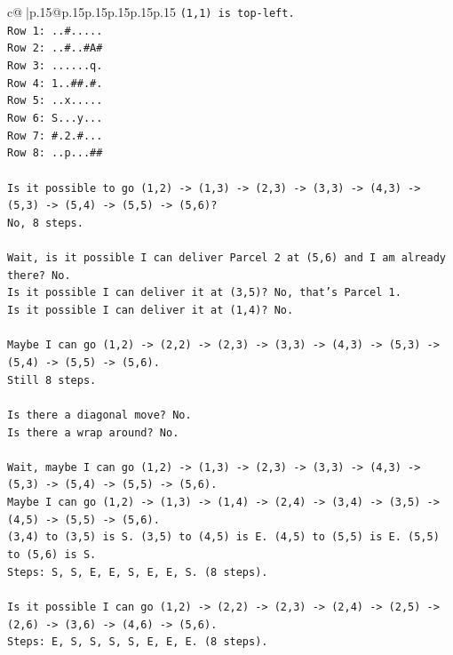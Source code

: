 \documentclass{article}
\begin{document}
{\begin{supertabular}{c@{$\;$}|p{.15\linewidth}@{}p{.15\linewidth}p{.15\linewidth}p{.15\linewidth}p{.15\linewidth}p{.15\linewidth}}
{{{\texttt{(1,1) is top{-}left.} \\
\texttt{Row 1: ..\#.....} \\
\texttt{Row 2: ..\#..\#A\#} \\
\texttt{Row 3: ......q.} \\
\texttt{Row 4: 1..\#\#.\#.} \\
\texttt{Row 5: ..x.....} \\
\texttt{Row 6: S...y...} \\
\texttt{Row 7: \#.2.\#...} \\
\texttt{Row 8: ..p...\#\#} \\
\\ 
\texttt{Is it possible to go (1,2) {-}> (1,3) {-}> (2,3) {-}> (3,3) {-}> (4,3) {-}> (5,3) {-}> (5,4) {-}> (5,5) {-}> (5,6)?} \\
\texttt{No, 8 steps.} \\
\\ 
\texttt{Wait, is it possible I can deliver Parcel 2 at (5,6) and I am already there? No.} \\
\texttt{Is it possible I can deliver it at (3,5)? No, that's Parcel 1.} \\
\texttt{Is it possible I can deliver it at (1,4)? No.} \\
\\ 
\texttt{Maybe I can go (1,2) {-}> (2,2) {-}> (2,3) {-}> (3,3) {-}> (4,3) {-}> (5,3) {-}> (5,4) {-}> (5,5) {-}> (5,6).} \\
\texttt{Still 8 steps.} \\
\\ 
\texttt{Is there a diagonal move? No.} \\
\texttt{Is there a wrap around? No.} \\
\\ 
\texttt{Wait, maybe I can go (1,2) {-}> (1,3) {-}> (2,3) {-}> (3,3) {-}> (4,3) {-}> (5,3) {-}> (5,4) {-}> (5,5) {-}> (5,6).} \\
\texttt{Maybe I can go (1,2) {-}> (1,3) {-}> (1,4) {-}> (2,4) {-}> (3,4) {-}> (3,5) {-}> (4,5) {-}> (5,5) {-}> (5,6).} \\
\texttt{(3,4) to (3,5) is S. (3,5) to (4,5) is E. (4,5) to (5,5) is E. (5,5) to (5,6) is S.} \\
\texttt{Steps: S, S, E, E, S, E, E, S. (8 steps).} \\
\\ 
\texttt{Is it possible I can go (1,2) {-}> (2,2) {-}> (2,3) {-}> (2,4) {-}> (2,5) {-}> (2,6) {-}> (3,6) {-}> (4,6) {-}> (5,6).} \\
\texttt{Steps: E, S, S, S, S, E, E, E. (8 steps).} \\
}}}
\end{supertabular}}
\end{document}
